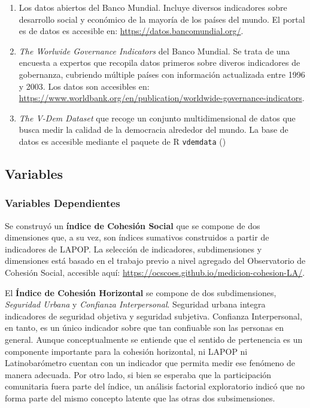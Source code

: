 \documentclass[
  spanish,
  letterpaper,
  DIV=11,
  numbers=noendperiod]{scrartcl}
\begin{document}
\begin{enumerate}
\def\labelenumi{\arabic{enumi})}
\item
  Los datos abiertos del Banco Mundial. Incluye diversos indicadores
  sobre desarrollo social y económico de la mayoría de los países del
  mundo. El portal es de datos es accesible en:
  \url{https://datos.bancomundial.org/}.
\item
  \emph{The Worlwide Governance Indicators} del Banco Mundial. Se trata
  de una encuesta a expertos que recopila datos primeros sobre diveros
  indicadores de gobernanza, cubriendo múltiple países con información
  actualizada entre 1996 y 2003. Los datos son accesibles en:
  \url{https://www.worldbank.org/en/publication/worldwide-governance-indicators}.
\item
  \emph{The V-Dem Dataset} que recoge un conjunto multidimensional de
  datos que busca medir la calidad de la democracia alrededor del mundo.
  La base de datos es accesible mediante el paquete de R
  \texttt{vdemdata} ()
\end{enumerate}

\subsection{Variables}\label{variables}

\subsubsection{Variables Dependientes}\label{variables-dependientes}

Se construyó un \textbf{índice de Cohesión Social} que se compone de dos
dimensiones que, a su vez, son índices sumativos construidos a partir de
indicadores de LAPOP. La selección de indicadores, subdimensiones y
dimensiones está basado en el trabajo previo a nivel agregado del
Observatorio de Cohesión Social, accesible aquí:
\url{https://ocscoes.github.io/medicion-cohesion-LA/}.

El \textbf{Índice de Cohesión Horizontal} se compone de dos
subdimensiones, \emph{Seguridad Urbana} y \emph{Confianza
Interpersonal}. Seguridad urbana integra indicadores de seguridad
objetiva y seguridad subjetiva. Confianza Interpersonal, en tanto, es un
único indicador sobre que tan confiuable son las personas en general.
Aunque conceptualmente se entiende que el sentido de pertenencia es un
componente importante para la cohesión horizontal, ni LAPOP ni
Latinobarómetro cuentan con un indicador que permita medir ese fenómeno
de manera adecuada. Por otro lado, si bien se esperaba que la
participación comunitaria fuera parte del índice, un análisis factorial
exploratorio indicó que no forma parte del mismo concepto latente que
las otras dos subsimensiones.
\end{document}
